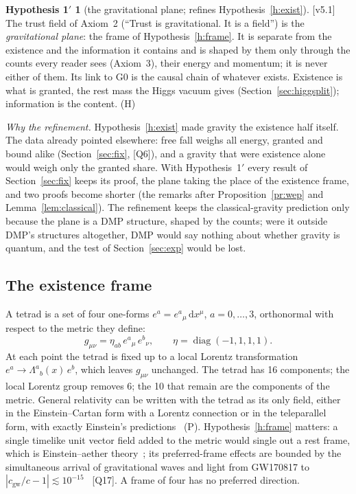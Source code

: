 \documentclass[11pt,a4paper]{article}
\theoremstyle{definition}
\theoremstyle{remark}
\newcommand{\chk}[1]{\textsf{[#1]}}
\newcommand{\tagH}{\textsf{(H)}}
\newcommand{\tagP}{\textsf{(P)}}
\newcommand{\dd}{\mathrm{d}}
\newcommand{\vtag}{{\color{newc}\textsf{\scriptsize[v5.1]}}}
\newenvironment{vnew}{\color{newc}}{}
\theoremstyle{definition}
\newtheorem*{hypothesisprime}{Hypothesis 1$'$}
\begin{document}
\begin{vnew}
\begin{hypothesisprime}[the gravitational plane; refines Hypothesis~\ref{h:exist}]
\vtag{} The trust field of Axiom~2 (``Trust is gravitational. It is a field'') is the \emph{gravitational plane}: the frame of
Hypothesis~\ref{h:frame}. It is separate from the existence and the information it contains and is shaped by them only through the counts
every reader sees (Axiom~3), their energy and momentum; it is never either of them. Its link to G0 is the causal chain of whatever exists.
Existence is what is granted, the rest mass the Higgs vacuum gives (Section~\ref{sec:higgsplit}); information is the content. \tagH
\end{hypothesisprime}

\noindent\vtag{} \emph{Why the refinement.} Hypothesis~\ref{h:exist} made gravity the existence half itself. The data already pointed
elsewhere: free fall weighs all energy, granted and bound alike (Section~\ref{sec:fix}, \chk{Q6}), and a gravity that were existence alone
would weigh only the granted share. With Hypothesis~1$'$ every result of Section~\ref{sec:fix} keeps its proof, the plane taking the place
of the existence frame, and two proofs become shorter (the remarks after Proposition~\ref{pr:wep} and Lemma~\ref{lem:classical}). The
refinement keeps the classical-gravity prediction only because the plane is a DMP structure, shaped by the counts; were it outside DMP's
structures altogether, DMP would say nothing about whether gravity is quantum, and the test of Section~\ref{sec:exp} would be lost.
\end{vnew}


\subsection{The existence frame}

A tetrad is a set of four one-forms $e^a=e^a{}_\mu\,\dd x^\mu$, $a=0,\dots,3$, orthonormal with respect to the metric they define:
\begin{equation}\label{eq:tetrad}
g_{\mu\nu}=\eta_{ab}\,e^a{}_\mu\,e^b{}_\nu,\qquad \eta=\operatorname{diag}(-1,1,1,1).
\end{equation}
At each point the tetrad is fixed up to a local Lorentz transformation $e^a\to\Lambda^a{}_b(x)\,e^b$, which leaves $g_{\mu\nu}$ unchanged.
The tetrad has 16 components; the local Lorentz group removes 6; the 10 that remain are the components of the metric. General relativity
can be written with the tetrad as its only field, either in the Einstein--Cartan form with a Lorentz connection or in the teleparallel
form, with exactly Einstein's predictions~\cite{aldrovandi} \tagP. Hypothesis~\ref{h:frame} matters: a single timelike unit vector field
added to the metric would single out a rest frame, which is Einstein--aether theory~\cite{aether}; its preferred-frame effects are bounded
by the simultaneous arrival of gravitational waves and light from GW170817 to $|c_{\text{gw}}/c-1|\lesssim10^{-15}$~\cite{gw170817}
\chk{Q17}. A frame of four has no preferred direction.
\end{document}
